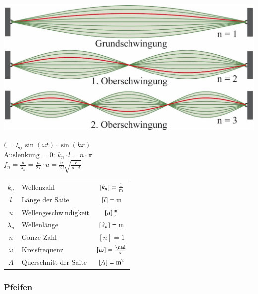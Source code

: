 \begin{minipage}{0.48\linewidth}
\includegraphics[width=0.98\linewidth]{Bilder/Wellen-Optik/saite} \\
\end{minipage}
\hfill
\begin{minipage}{0.48\linewidth}
$ \boxed{ \xi = \xi_0 \, \sin(\omega t) \cdot \sin(k x)  } $ \\

$ \boxed{ \text{Auslenkung = 0: } k_n \cdot l = n \cdot \pi } $ \\

$ \boxed{ f_n = \frac{u}{\lambda_n} = \frac{n}{2 \, l} \cdot u =  \frac{n}{2 \, l} \sqrt{\frac{F}{\rho \cdot A}} } $ \\
\end{minipage}

\vspace{0.2cm}

\renewcommand{\arraystretch}{1.1}
\begin{tabular}{clc}
$k_n$ & Wellenzahl & $[k_n] = \frac{1}{\mathrm{m}} $ \\
$l$ & Länge der Saite & $[l] = \mathrm{m}$ \\
$u$ & Wellengeschwindigkeit & $[u] \frac{\mathrm{m}}{\mathrm{s}}$ \\
$\lambda_n$ & Wellenlänge & $[\lambda_n]= \mathrm{m}$ \\
$n$ & Ganze Zahl & $[n] = 1$ \\
$\omega$ & Kreisfrequenz & $[\omega] = \frac{\rad}{\s}$ \\
$A$ & Querschnitt der Saite & $[A] = \mathrm{m}^2$
\end{tabular}



\subsubsection{Pfeifen}

